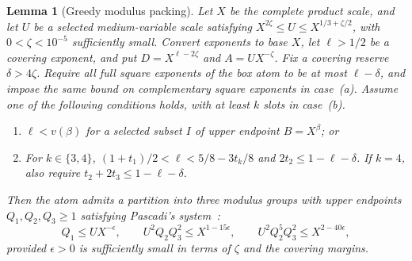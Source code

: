 \documentclass[11pt,reqno]{amsart}
\newtheorem{lemma}[theorem]{Lemma}
\theoremstyle{remark}
\numberwithin{equation}{section}
\begin{document}
\begin{lemma}[Greedy modulus packing]\label{lem:packing}
Let $X$ be the complete product scale, and let $U$ be a selected medium-variable scale satisfying $X^{2\zeta} \le U \le X^{1/3+\zeta/2}$, with $0 < \zeta < 10^{-5}$ sufficiently small. Convert exponents to base $X$, let $\ell>1/2$ be a covering exponent, and put $D = X^{\ell - 2\zeta}$ and $A = U X^{-\zeta}$. Fix a covering reserve $\delta>4\zeta$. Require all full square exponents of the box atom to be at most $\ell-\delta$, and impose the same bound on complementary square exponents in case~(a). Assume one of the following conditions holds, with at least $k$ slots in case~(b).
\begin{enumerate}
\item[(a)] $\ell < v(\beta)$ for a selected subset $I$ of upper endpoint $B = X^\beta$; or
\item[(b)] For $k\in\{3,4\}$, $(1+t_1)/2<\ell<5/8-3t_k/8$ and $2t_2\le1-\ell-\delta$. If $k=4$, also require $t_2+2t_3\le1-\ell-\delta$.
\end{enumerate}
Then the atom admits a partition into three modulus groups with upper endpoints $Q_1, Q_2, Q_3 \ge 1$ satisfying Pascadi's system~\cite[eq.~(4.15)]{Pascadi2025}:
\begin{equation}\label{eq:pascadi_cond}
Q_1 \le U X^{-\epsilon}, \qquad U^2 Q_2 Q_3^2 \le X^{1 - 15\epsilon}, \qquad U^2 Q_2^5 Q_3^2 \le X^{2 - 40\epsilon},
\end{equation}
provided $\epsilon > 0$ is sufficiently small in terms of $\zeta$ and the covering margins.
\end{lemma}
\end{document}
